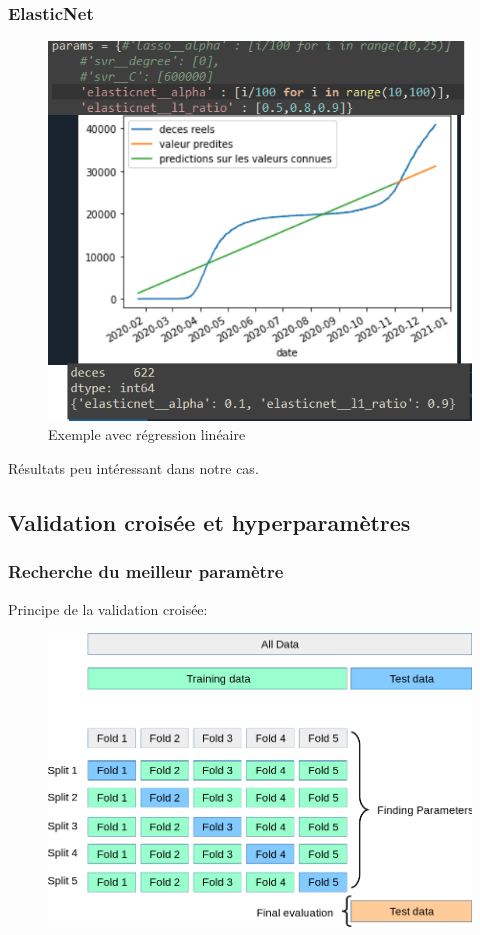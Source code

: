 \documentclass{beamer}
\begin{document}
\begin{frame}
	\frametitle{ElasticNet}
	\begin{figure}[b]
		\includegraphics[scale=0.3]{EN}
		\centering
		\caption{Exemple avec régression linéaire}
	\end{figure}
	Résultats peu intéressant dans notre cas.
\end{frame}

\subsection{Validation croisée et hyperparamètres}
\begin{frame}
	\frametitle{Recherche du meilleur paramètre}
	Principe de la  validation croisée:
	\begin{figure}[b]
		\centering
		\includegraphics[scale=0.27]{gscv}
	\end{figure}
\end{frame}
\end{document}
